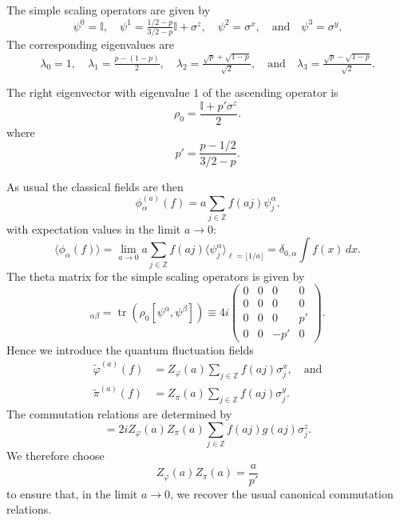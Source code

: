 \documentclass[prl,twocolumn,lengthcheck,superscriptaddress]{revtex4-1}
\newcommand{\tr}{\operatorname{tr}}
\theoremstyle{definition}
\theoremstyle{remark}
\begin{document}
The simple scaling operators are given by
\begin{equation}
	\psi^0 = \mathbb{I}, \quad \psi^{1} = \tfrac{1/2-p}{3/2-p}\mathbb{I} + \sigma^z, \quad \psi^2 = \sigma^x, \quad\text{and}\quad \psi^{3} = \sigma^y.
\end{equation}
The corresponding eigenvalues are 
\begin{equation}
	\lambda_0 = 1, \quad \lambda_{1} = \tfrac{p-(1-p)}{2}, \quad \lambda_2 = \tfrac{\sqrt{p}+\sqrt{1-p}}{\sqrt{2}}, \quad\text{and}\quad \lambda_{3} = \tfrac{\sqrt{p}-\sqrt{1-p}}{\sqrt{2}}.
\end{equation}


The right eigenvector with eigenvalue $1$ of the ascending operator is 
\begin{equation}
	\rho_0 = \frac{\mathbb{I} + p'\sigma^z}{2}.
\end{equation}
where
\begin{equation}
	p' = \frac{p-1/2}{3/2-p}.
\end{equation}

As usual the classical fields are then 
\begin{equation}
	\phi_\alpha^{(a)}(f) = a\sum_{j\in \mathbb{Z}} f(aj) \psi^{\alpha}_j.
\end{equation}
with expectation values in the limit $a\rightarrow 0$: 
\begin{equation}
	\langle\phi_\alpha(f)\rangle = \lim_{a\rightarrow 0}a\sum_{j\in \mathbb{Z}} f(aj) \langle \psi^{\alpha}_j\rangle_{\ell = \lfloor 1/a\rfloor} = \delta_{0,\alpha} \int f(x)\, dx.
\end{equation}
The theta matrix for the simple scaling operators is given by
\begin{equation}	
	[\Theta]_{\alpha\beta} = \tr(\rho_0 [\psi^\alpha,\psi^\beta]) \equiv 4i\begin{pmatrix} 0 & 0 & 0 & 0\\ 0 & 0 & 0 & 0\\ 0 & 0 & 0 & p'\\ 0 & 0 & -p' & 0\end{pmatrix}.
\end{equation}
Hence we introduce the quantum fluctuation fields 
\begin{equation}
	\begin{split}
		\widetilde{\varphi}^{(a)}(f) &= Z_{\varphi}(a)\sum_{j\in \mathbb{Z}} f(aj) \sigma^x_j, \quad \text{and} \\
		\widetilde{\pi}^{(a)}(f) &= Z_{\pi}(a)\sum_{j\in \mathbb{Z}} f(aj) \sigma^y_j.
	\end{split}
\end{equation}
The commutation relations are determined by
\begin{equation}
	[\widetilde{\varphi}^{(a)}(f), \widetilde{\pi}^{(a)}(g)] = 2iZ_{\varphi}(a)Z_{\pi}(a)\sum_{j\in \mathbb{Z}} f(aj)g(aj)\sigma^z_j .
\end{equation}
We therefore choose 
\begin{equation}
	Z_{\varphi}(a)Z_{\pi}(a) = \frac{a}{p'}
\end{equation}
to ensure that, in the limit $a\rightarrow 0$, we recover the usual canonical commutation relations.
\end{document}
